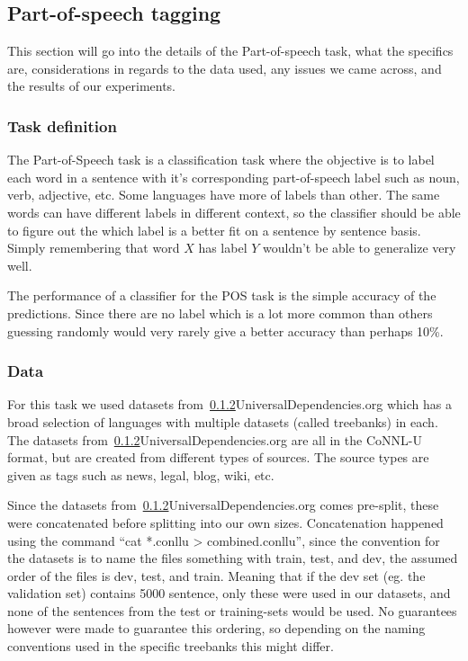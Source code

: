
\subsection{Part-of-speech tagging}

This section will go into the details of the Part-of-speech task, what the
specifics are, considerations in regards to the data used, any issues we came
across, and the results of our experiments.

\subsubsection{Task definition}

The Part-of-Speech task is a classification task where the objective is to label
each word in a sentence with it's corresponding part-of-speech label such as
noun, verb, adjective, etc. Some languages have more of labels than other. The
same words can have different labels in different context, so the classifier
should be able to figure out the which label is a better fit on a sentence by
sentence basis. Simply remembering that word $X$ has label $Y$ wouldn't be able
to generalize very well.

The performance of a classifier for the POS task is the simple accuracy of the
predictions. Since there are no label which is a lot more common than others
guessing randomly would very rarely give a better accuracy than perhaps 10\%.

\subsubsection{Data}

For this task we used datasets from~\ref{}{UniversalDependencies.org} which has
a broad selection of languages with multiple datasets (called treebanks) in
each. The datasets from~\ref{}{UniversalDependencies.org} are all in the CoNNL-U
format, but are created from different types of sources. The source types are
given as tags such as news, legal, blog, wiki, etc.

Since the datasets from~\ref{}{UniversalDependencies.org} comes pre-split, these
were concatenated before splitting into our own sizes. Concatenation happened
using the command ``cat *.conllu > combined.conllu'', since the convention for
the datasets is to name the files something with train, test, and dev, the
assumed order of the files is dev, test, and train. Meaning that if the dev set
(eg. the validation set) contains 5000 sentence, only these were used in our
datasets, and none of the sentences from the test or training-sets would be
used. No guarantees however were made to guarantee this ordering, so depending
on the naming conventions used in the specific treebanks this might differ.

